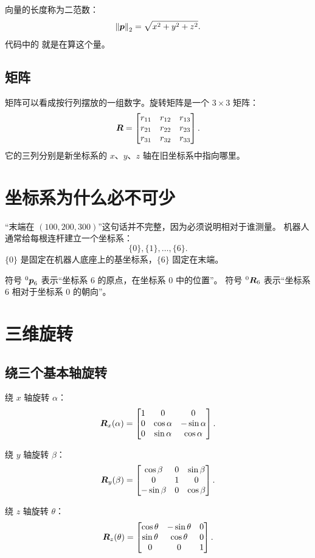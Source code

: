 向量的长度称为二范数：
\[
\left\lVert \boldsymbol{p}\right\rVert_2=\sqrt{x^2+y^2+z^2}.
\]
代码中的  就是在算这个量。

\subsection{矩阵}

矩阵可以看成按行列摆放的一组数字。旋转矩阵是一个 $3\times3$ 矩阵：
\[
\boldsymbol{R}=
\begin{bmatrix}
r_{11}&r_{12}&r_{13}\\
r_{21}&r_{22}&r_{23}\\
r_{31}&r_{32}&r_{33}
\end{bmatrix}.
\]
它的三列分别是新坐标系的 $x$、$y$、$z$ 轴在旧坐标系中指向哪里。

\section{坐标系为什么必不可少}

“末端在 $(100,200,300)$”这句话并不完整，因为必须说明相对于谁测量。
机器人通常给每根连杆建立一个坐标系：
\[
\{0\},\{1\},\ldots,\{6\}.
\]
$\{0\}$ 是固定在机器人底座上的基坐标系，$\{6\}$ 固定在末端。

符号 ${}^0\boldsymbol{p}_6$ 表示“坐标系 6 的原点，在坐标系 0 中的位置”。
符号 ${}^0\boldsymbol{R}_6$ 表示“坐标系 6 相对于坐标系 0 的朝向”。

\section{三维旋转}

\subsection{绕三个基本轴旋转}

绕 $x$ 轴旋转 $\alpha$：
\[
\boldsymbol{R}_x(\alpha)=
\begin{bmatrix}
1&0&0\\
0&\cos\alpha&-\sin\alpha\\
0&\sin\alpha&\cos\alpha
\end{bmatrix}.
\]

绕 $y$ 轴旋转 $\beta$：
\[
\boldsymbol{R}_y(\beta)=
\begin{bmatrix}
\cos\beta&0&\sin\beta\\
0&1&0\\
-\sin\beta&0&\cos\beta
\end{bmatrix}.
\]

绕 $z$ 轴旋转 $\theta$：
\[
\boldsymbol{R}_z(\theta)=
\begin{bmatrix}
\cos\theta&-\sin\theta&0\\
\sin\theta&\cos\theta&0\\
0&0&1
\end{bmatrix}.
\]

